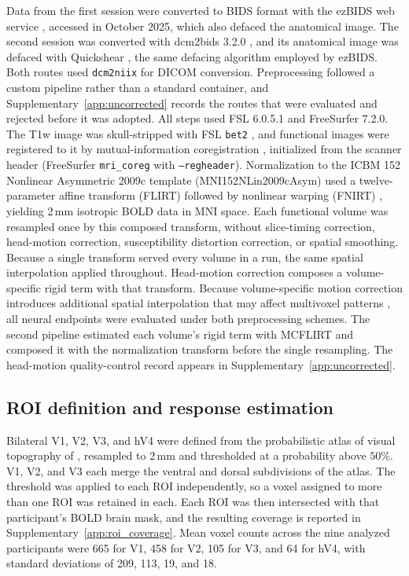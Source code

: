 Data from the first session were converted to BIDS format with the ezBIDS web service \parencite{levitas2024}, accessed in October 2025, which also defaced the anatomical image. The second session was converted with dcm2bids 3.2.0 \parencite{dcm2bids}, and its anatomical image was defaced with Quickshear \parencite{schimke2011}, the same defacing algorithm employed by ezBIDS. Both routes used \texttt{dcm2niix} for DICOM conversion. Preprocessing followed a custom pipeline rather than a standard container, and Supplementary~\cref{app:uncorrected} records the routes that were evaluated and rejected before it was adopted. All steps used FSL 6.0.5.1 and FreeSurfer 7.2.0. The T1w image was skull-stripped with FSL \texttt{bet2} \parencite{smith2002}, and functional images were registered to it by mutual-information coregistration \parencite{wells1996, maes1997}, initialized from the scanner header (FreeSurfer \texttt{mri\_coreg} with \texttt{--regheader}). Normalization to the ICBM 152 Nonlinear Asymmetric 2009c template (MNI152NLin2009cAsym) used a twelve-parameter affine transform (FLIRT) followed by nonlinear warping (FNIRT) \parencite{jenkinson2002, andersson2007}, yielding 2\,mm isotropic BOLD data in MNI space. Each functional volume was resampled once by this composed transform, without slice-timing correction, head-motion correction, susceptibility distortion correction, or spatial smoothing. Because a single transform served every volume in a run, the same spatial interpolation applied throughout. Head-motion correction composes a volume-specific rigid term with that transform. Because volume-specific motion correction introduces additional spatial interpolation that may affect multivoxel patterns \parencite{grootoonk2000}, all neural endpoints were evaluated under both preprocessing schemes. The second pipeline estimated each volume's rigid term with MCFLIRT \parencite{jenkinson2002} and composed it with the normalization transform before the single resampling. The head-motion quality-control record appears in Supplementary~\cref{app:uncorrected}.

\subsection{ROI definition and response estimation}
\label{sec:methods:roi}

Bilateral V1, V2, V3, and hV4 were defined from the probabilistic atlas of visual topography of \textcite{wang2015}, resampled to 2\,mm and thresholded at a probability above $50\%$. V1, V2, and V3 each merge the ventral and dorsal subdivisions of the atlas. The threshold was applied to each ROI independently, so a voxel assigned to more than one ROI was retained in each. Each ROI was then intersected with that participant's BOLD brain mask, and the resulting coverage is reported in Supplementary~\cref{app:roi_coverage}. Mean voxel counts across the nine analyzed participants were 665 for V1, 458 for V2, 105 for V3, and 64 for hV4, with standard deviations of 209, 113, 19, and 18.

